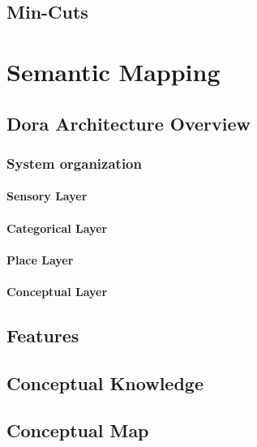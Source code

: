 \section{Min-Cuts}


\chapter{Semantic Mapping}\label{chap:semantic-mapping}

% 

\section{Dora Architecture Overview}
\subsection{System organization}
\subsubsection{Sensory Layer}
\subsubsection{Categorical Layer}
\subsubsection{Place Layer}
\subsubsection{Conceptual Layer}

\section{Features}
\section{Conceptual Knowledge}
\section{Conceptual Map}

